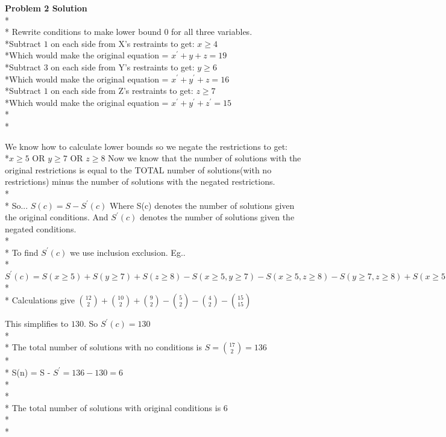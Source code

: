 \documentclass{article}
\begin{document}
\textbf{Problem 2 Solution}
\\*\\*
Rewrite conditions to make lower bound $0$ for all three variables.
\\*Subtract $1$ on each side from X's restraints to get: $x \geq 4$
\\*Which would make the original equation = $x^\prime + y + z = 19$
\\*Subtract $3$ on each side from Y's restraints to get: $y \geq 6$
\\*Which would make the original equation = $x^\prime + y^\prime + z = 16$
\\*Subtract $1$ on each side from Z's restraints to get: $z \geq 7$
\\*Which would make the original equation = $x^\prime + y^\prime + z^\prime = 15$
\\*\\*

We know how to calculate lower bounds so we negate the restrictions to get:
\\*$x \geq 5$ OR $y \geq 7$ OR $z \geq 8$
Now we know that the number of solutions with the original restrictions is equal to the TOTAL number of solutions(with no restrictions) minus the number of solutions with the negated restrictions.
\\*\\*
So... $S(c) = S - S^\prime(c)$ Where S(c) denotes the number of solutions given the original conditions. And $S^\prime(c)$ denotes the number of solutions given the negated conditions.
\\*\\*
To find $S^\prime(c)$ we use inclusion exclusion. Eg..
\\*$S^\prime(c) = S(x \geq 5) + S(y \geq 7) + S(z \geq 8) - S(x \geq 5, y \geq 7) - S(x \geq 5, z \geq 8) - S(y \geq 7, z \geq 8) + S(x \geq 5, y \geq 7, z \geq 8)$
\\*\\*
Calculations give ${12 \choose 2} + {10 \choose 2} + {9 \choose 2} - {5 \choose 2} - {4 \choose 2} - {15 \choose 15}$ 

This simplifies to $130$. So $S^\prime(c) = 130$
\\*\\*
The total number of solutions with no conditions is $S = {17 \choose 2} = 136$
\\*\\*
S(n) = S - $S^\prime = 136 - 130 = 6$
\\*\\*\\*
The total number of solutions with original conditions is $6$
\\*\\*
\end{document}

